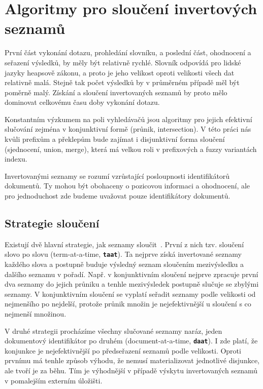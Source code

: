 \documentclass[11pt,letterpaper,oneside,openright]{book}
\newcommand{\bftt}[1]{\texttt{\textbf{#1}}}
\begin{document}
\section{Algoritmy pro sloučení invertových seznamů}
První část vykonání dotazu, prohledání slovníku, a poslední část, ohodnocení a
seřazení výsledků, by měly být relativně rychlé. Slovník odpovídá pro lidské
jazyky heapsově zákonu, a proto je jeho velikost oproti velikosti všech dat
relativně malá.  Stejně tak počet výsledků by v průměrném případě měl být
poměrně malý. Získání a sloučení invertovaných seznamů by proto mělo dominovat
celkovému času doby vykonání dotazu.

Konstantním výzkumem na poli vyhledávačů jsou algoritmy pro jejich efektivní
slučování zejména v konjunktivní formě (průnik, intersection). V této práci nás
kvůli prefixům a překlepům bude zajímat i disjunktivní forma sloučení
(sjednocení, union, merge), která má velkou roli v prefixových a fuzzy
variantách indexu.

Invertovanými seznamy se rozumí vzrůstající posloupnosti identifikátorů
dokumentů. Ty mohou být obohaceny o pozicovou informaci a ohodnocení, ale pro
jednoduchost zde budeme uvažovat pouze identifikátory dokumentů.

\subsection{Strategie sloučení}
Existují dvě hlavní strategie, jak seznamy
sloučit~\cite{Lacour_efficiencycomparison}. První z nich tzv. sloučení slovo po
slovu (term-at-a-time, \bftt{taat}). Ta nejprve získá invertované seznamy
každého slova a postupně buduje výsledný seznam sloučením mezivýsledku a
dalšího seznamu v pořadí. Např. v konjunktivním sloučení nejprve zpracuje první
dva seznamy do jejich průniku a tenhle mezivýsledek postupně slučuje se zbylými
seznamy. V konjunktivním sloučení se vyplatí seřadit seznamy podle velikosti od
nejmenšího po nejdelší, protože průnik množin je nejefektivnější u sloučení s
co nejmenší množinou.

V druhé strategii procházíme všechny slučované seznamy naráz, jeden dokumentový
identifikátor po druhém (document-at-a-time, \bftt{daat}). I zde platí, že
konjunkce je nejefektivnější po předseřazení seznamů podle velikosti. Oproti
prvnímu má tenhle způsob výhodu, že nemusí materializovat jednotlivé disjunkce,
ale tvoří je za běhu. Tím je výhodnější v případě výskytu invertovaných seznamů
v pomalejším externím úložišti.
\end{document}
